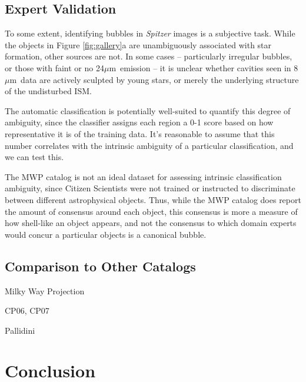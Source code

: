 \documentclass[preprint]{aastex}
\newcommand{\um}[0]{$\mu$m}
\begin{document}
\subsection{Expert Validation}

To some extent, identifying bubbles in \textit{Spitzer} images is a subjective task. While the objects in Figure \ref{fig:gallery}a are unambiguously associated with star formation, other sources are not. In some cases -- particularly irregular bubbles, or those with faint or no 24\um\, emission -- it is unclear whether cavities seen in 8 \um\, data are actively sculpted by young stars, or merely the underlying structure of the undisturbed ISM. 

The automatic classification is potentially well-suited to quantify this degree of ambiguity, since the classifier assigns each region a 0-1 score based on how representative it is of the training data. It's reasonable to assume that this number correlates with the intrinsic ambiguity of a particular classification, and we can test this.

The MWP catalog is not an ideal dataset for assessing intrinsic classification ambiguity, since Citizen Scientists were not trained or instructed to discriminate between different astrophysical objects. Thus, while the MWP catalog does report the amount of consensus around each object, this consensus is more a measure of how shell-like an object appears, and not the consensus to which domain experts would concur a particular objects is a canonical bubble.


\subsection{Comparison to Other Catalogs}
\label{sec:comparison}
Milky Way Projection

CP06, CP07

Pallidini



\section{Conclusion}
\label{sec:conclusion}
\end{document}
